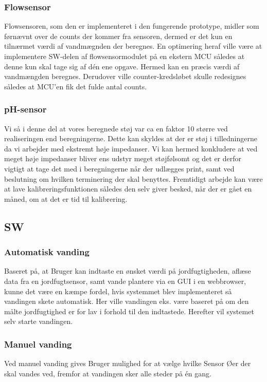 \subsubsection{Flowsensor}
Flowsensoren, som den er implementeret i den fungerende prototype, midler som førnævnt over de counts der kommer fra sensoren, dermed er det kun en tilnærmet værdi af vandmægnden der beregnes. En optimering heraf ville være at implementere SW-delen af flowsensormodulet på en ekstern MCU således at denne kun skal tage sig af dén ene opgave. Hermed kan en præcis værdi af vandmængden beregnes. Derudover ville counter-kredsløbet skulle redesignes således at MCU'en fik det fulde antal counts.\newline

\subsubsection{pH-sensor}
Vi så i denne del at vores beregnede støj var ca en faktor 10 større ved realiseringen end beregningerne. Dette kan skyldes at der er støj i tilledningerne da vi arbejder med ekstremt høje impedanser. Vi kan hermed konkludere at ved meget høje impedanser bliver ens udstyr meget støjfølsomt og det er derfor vigtigt at tage det med i beregningerne når der udlægges print, samt ved beslutning om hvilken terminering der skal benyttes. Fremtidigt arbejde kan være at lave kalibreringsfunktionen således den selv giver besked, når der er gået en måned, om at det er tid til kalibrering. 
 
 
\subsection{SW} 
\subsubsection{Automatisk vanding}
Baseret på, at Bruger kan indtaste en ønsket værdi på jordfugtigheden, aflæse data fra en jordfugtsensor, samt vande plantere via en GUI i en webbrowser, kunne det være en kæmpe fordel, hvis systemmet blev implementeret så vandingen skete automatisk. Her ville vandingen eks. være baseret på om den målte jordfugtighed er for lav i forhold til den indtastede. Herefter vil systemet selv starte vandingen.\newline 

\subsubsection{Manuel vanding}
Ved manuel vanding gives Bruger mulighed for at vælge hvilke Sensor Øer der skal vandes ved, fremfor at vandingen sker alle steder på én gang.\newline 

